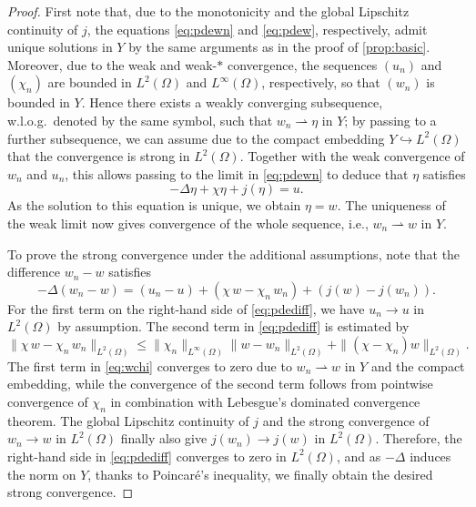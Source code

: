 \documentclass[reqno]{shinyart}
\begin{document}
\begin{proof}
    First note that, due to the monotonicity and the global Lipschitz continuity of $j$, the equations
    \eqref{eq:pdewn} and \eqref{eq:pdew}, respectively, admit unique solutions in $Y$
    by the same arguments as in the proof of \cref{prop:basic}.
    Moreover, due to the weak and weak-$\ast$ convergence, the sequences $(u_n)$ and $(\chi_n)$ 
    are bounded in $L^2(\Omega)$ and $L^\infty(\Omega)$, respectively, so that $(w_n)$ is 
    bounded in $Y$. Hence there exists a weakly converging subsequence, w.l.o.g.\ denoted by the same symbol, 
    such that $w_n {\rightharpoonup} \eta$ in $Y$; by passing to a further subsequence, we can assume  due to the compact embedding $Y\hookrightarrow L^2(\Omega)$ that the convergence is strong
    in $L^2(\Omega)$. Together with the weak convergence of $w_n$ and $u_n$,  
    this allows passing to the limit in \eqref{eq:pdewn} to deduce that $\eta$ satisfies
    \begin{equation*}
        -\Delta \eta + \chi  \eta  + j(\eta)= u.
    \end{equation*}
    As the solution to this equation is unique, we obtain $\eta = w$.
    The uniqueness of the weak limit now gives convergence of the whole sequence, 
    i.e., $w_n {\rightharpoonup} w$ in $Y$.

    To prove the strong convergence under the additional assumptions, note that the difference 
    $w_n-w$ satisfies 
    \begin{equation}\label{eq:pdediff}
        -\Delta (w_n - w) = (u_n - u) + (\chi\,w - \chi_n\, w_n) + (j(w) - j(w_n)). 
    \end{equation}  
    For the first term on the right-hand side of \eqref{eq:pdediff}, we have $u_n \to u$ in $L^2(\Omega)$ by assumption.
    The second term in \eqref{eq:pdediff} is estimated by
    \begin{equation}\label{eq:wchi}
        \|\chi\,w - \chi_n\, w_n\|_{L^2(\Omega)}
        \leq \|\chi_n\|_{L^\infty(\Omega)}\|w - w_n\|_{L^2(\Omega)}
        + \|(\chi - \chi_n)w\|_{L^2(\Omega)}.
    \end{equation}
    The first term in \eqref{eq:wchi} converges to zero due to $w_n {\rightharpoonup} w$ in $Y$ and the compact embedding, while the convergence of the second term follows from pointwise convergence of $\chi_n$ in combination with Lebesgue's dominated convergence theorem. 
    The global Lipschitz continuity of $j$ and the strong convergence of $w_n \to w$ in $L^2(\Omega)$ 
    finally also give $j(w_n) \to j(w)$ in $L^2(\Omega)$. 
    Therefore, the right-hand side in \eqref{eq:pdediff} converges to zero in $L^2(\Omega)$, and as 
    $-\Delta$ induces the norm on $Y$, thanks to Poincar\'e's inequality, we finally obtain 
    the desired strong convergence.
\end{proof}
\end{document}
